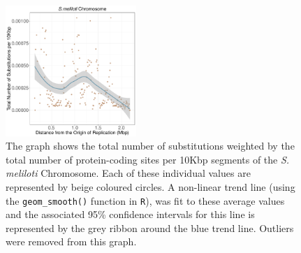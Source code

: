 \documentclass[11pt]{article}
\newcommand{\smel}{\textit{S.\,meliloti}\xspace}
\providecommand{\DIFaddbegin}{} %
\providecommand{\DIFdelbegin}{} %
\providecommand{\DIFdelend}{} %
\providecommand{\DIFaddbeginFL}{} %
\providecommand{\DIFaddendFL}{} %
\providecommand{\DIFdelbeginFL}{} %
\providecommand{\DIFdelendFL}{} %
\begin{document}
\DIFdelbegin %
\DIFdelend \DIFaddbegin \begin{figure}[H]
	\DIFaddendFL \begin{center}
		\DIFdelbeginFL %
\DIFdelendFL \DIFaddbeginFL \includegraphics[width=0.44\textwidth]{./figs/sinoC_10KB_weighted_subs_nonpar_22Sep20.pdf}
		\DIFaddendFL \caption{\label{fig:sinoC_nonpar}The graph shows the total number of substitutions weighted by the total number of protein-coding sites per 10Kbp segments of the \smel Chromosome. Each of these individual values are represented by beige coloured circles. A non-linear trend line (using the \texttt{geom\_smooth()} function in \texttt{R}), was fit to these average values and the associated 95\% confidence intervals for this line is represented by the grey ribbon around the blue trend line. Outliers were removed from this graph.}
	\end{center}
\end{figure}
\end{document}
